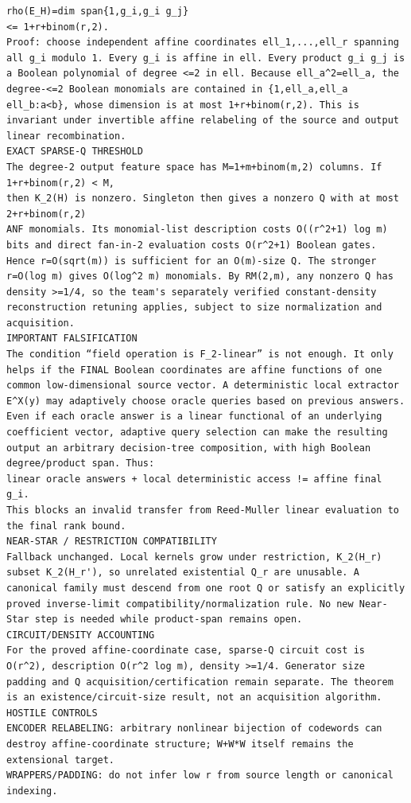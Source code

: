 \documentclass[11pt]{article}
\begin{document}
\begin{Verbatim}[breaklines=true,breakanywhere=true]
rho(E_H)=dim span{1,g_i,g_i g_j}
<= 1+r+binom(r,2).
Proof: choose independent affine coordinates ell_1,...,ell_r spanning all g_i modulo 1. Every g_i is affine in ell. Every product g_i g_j is a Boolean polynomial of degree <=2 in ell. Because ell_a^2=ell_a, the degree-<=2 Boolean monomials are contained in {1,ell_a,ell_a ell_b:a<b}, whose dimension is at most 1+r+binom(r,2). This is invariant under invertible affine relabeling of the source and output linear recombination.
EXACT SPARSE-Q THRESHOLD
The degree-2 output feature space has M=1+m+binom(m,2) columns. If
1+r+binom(r,2) < M,
then K_2(H) is nonzero. Singleton then gives a nonzero Q with at most
2+r+binom(r,2)
ANF monomials. Its monomial-list description costs O((r^2+1) log m) bits and direct fan-in-2 evaluation costs O(r^2+1) Boolean gates.
Hence r=O(sqrt(m)) is sufficient for an O(m)-size Q. The stronger r=O(log m) gives O(log^2 m) monomials. By RM(2,m), any nonzero Q has density >=1/4, so the team's separately verified constant-density reconstruction retuning applies, subject to size normalization and acquisition.
IMPORTANT FALSIFICATION
The condition “field operation is F_2-linear” is not enough. It only helps if the FINAL Boolean coordinates are affine functions of one common low-dimensional source vector. A deterministic local extractor E^X(y) may adaptively choose oracle queries based on previous answers. Even if each oracle answer is a linear functional of an underlying coefficient vector, adaptive query selection can make the resulting output an arbitrary decision-tree composition, with high Boolean degree/product span. Thus:
linear oracle answers + local deterministic access != affine final g_i.
This blocks an invalid transfer from Reed-Muller linear evaluation to the final rank bound.
NEAR-STAR / RESTRICTION COMPATIBILITY
Fallback unchanged. Local kernels grow under restriction, K_2(H_r) subset K_2(H_r'), so unrelated existential Q_r are unusable. A canonical family must descend from one root Q or satisfy an explicitly proved inverse-limit compatibility/normalization rule. No new Near-Star step is needed while product-span remains open.
CIRCUIT/DENSITY ACCOUNTING
For the proved affine-coordinate case, sparse-Q circuit cost is O(r^2), description O(r^2 log m), density >=1/4. Generator size padding and Q acquisition/certification remain separate. The theorem is an existence/circuit-size result, not an acquisition algorithm.
HOSTILE CONTROLS
ENCODER RELABELING: arbitrary nonlinear bijection of codewords can destroy affine-coordinate structure; W+W*W itself remains the extensional target.
WRAPPERS/PADDING: do not infer low r from source length or canonical indexing.

\end{Verbatim}
\end{document}
